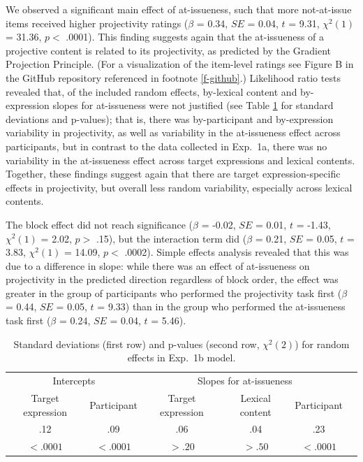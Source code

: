 \documentclass[11pt,fleqn]{article}
\newcommand{\6}{\mbox{$[\hspace*{-.6mm}[$}}
\newcommand{\9}{\mbox{$]\hspace*{-.6mm}]$}}
\newcommand{\tableref}[1]{Table \ref{#1}}
\begin{document}
We observed a significant main effect of at-issueness, such that more not-at-issue items received higher projectivity ratings ($\beta$ = 0.34, $SE$ = 0.04, $t$ = 9.31, $\chi^2(1)$ = 31.36, $p <$ .0001). This finding suggests again that the at-issueness of a projective content is related to its projectivity, as predicted by the Gradient Projection Principle. (For a visualization of the item-level ratings see Figure B in the GitHub repository referenced in footnote \ref{f-github}.)  Likelihood ratio tests revealed that, of the included random effects, by-lexical content and by-expression slopes for at-issueness were not justified (see \tableref{tab:random1b} for standard deviations and p-values); that is, there was by-participant and by-expression variability in projectivity, as well as variability in the at-issueness effect across participants, but in contrast to the data collected in Exp.~1a, there was no variability in the at-issueness effect across target expressions and lexical contents. Together, these findings suggest again that there are target expression-specific effects in projectivity, but overall less random variability, especially across lexical contents. 

The block effect did not reach significance ($\beta$ = -0.02, $SE$ = 0.01, $t$ = -1.43, $\chi^2(1)$ = 2.02, $p >$ .15), but the interaction term did ($\beta$ = 0.21, $SE$ = 0.05, $t$ = 3.83, $\chi^2(1)$ = 14.09, $p <$ .0002). Simple effects analysis revealed that this was due to a difference in slope: while there was an effect of at-issueness on projectivity in the predicted direction regardless of block order, the effect was greater in the group of participants who performed the projectivity task first ($\beta$ = 0.44, $SE$ = 0.05, $t$ = 9.33) than in the group who performed the at-issueness task first ($\beta$ = 0.24, $SE$ = 0.04, $t$ = 5.46).


\begin{table}
\begin{center}
\begin{tabular}{c c c c c c }
\toprule
\multicolumn{2}{c}{Intercepts} & \multicolumn{3}{c}{Slopes for at-issueness}\\
Target expression & Participant & Target expression & Lexical content & Participant\\
\midrule
.12 & .09 & .06 & .04 & .23\\
$< .0001$ & $< .0001$ & $> .20$ & $> .50$ & $< .0001$ \\
\bottomrule
\end{tabular}
\caption{Standard deviations (first row) and p-values (second row, $\chi^2(2)$) for random effects in Exp.~1b model.}\label{tab:random1b}
\end{center}
\end{table}
\end{document}
